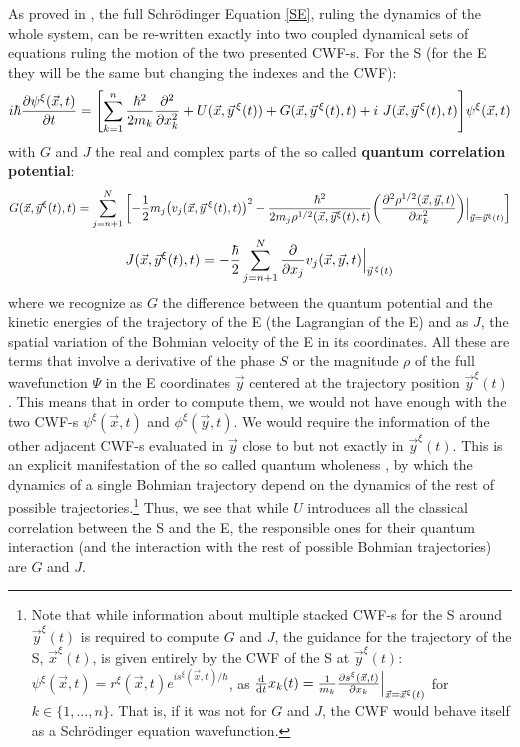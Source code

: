 \documentclass[11pt, a4paper]{article} %
\begin{document}
As proved in \cite{GJ}, the full Schrödinger Equation \eqref{SE}, ruling the dynamics of the whole system, can be re-written exactly into two coupled dynamical sets of equations ruling the motion of the two presented CWF-s. For the S (for the E they will be the same but changing the indexes and the CWF):
\begin{equation}\label{SE.GJ}
i \hbar \pdv{\psi^\xi (\vec{x},t)}{t} = \qty[\sum_{k=1}^n\frac{\hbar^2}{2m_k} \pdv[2]{}{x_k} +  U(\vec{x}, \vec{y}^{\, \xi}(t)) + G(\vec{x}, \vec{y}^{\, \xi}(t),t)+i\ J(\vec{x}, \vec{y}^{\, \xi}(t),t)] \psi^\xi (\vec{x},t)
\end{equation}
with $G$ and $J$ the real and complex parts of the so called {\bf quantum correlation potential}:
\begin{equation}\label{G.Bohm}
G(\vec{x},\vec{y}^\xi(t),t)=\sum_{j=n+1}^N\qty[-\frac{1}{2}m_j\qty(v_j(\vec{x},\vec{y}^{\, \xi}(t),t))^2-\frac{\hbar^2}{2m_j\rho^{1/2}(\vec{x},\vec{y}^\xi(t),t)}\qty(\pdv[2]{\rho^{1/2}(\vec{x},\vec{y},t)}{x_k})\Big\rvert_{\vec{y}=\vec{y}^\xi(t)} ]
\end{equation}
\begin{equation}\label{J.Bohm}
J(\vec{x},\vec{y}^\xi(t),t)=-\frac{\hbar}{2}\sum_{j=n+1}^N\pdv{}{x_j}v_j(\vec{x},\vec{y},t)\Big\rvert_{\vec{y}^{\, \xi}(t)}
\end{equation}
where we recognize as $G$ the difference between the quantum potential \cite{JordiXavier, Durr} and the kinetic energies of the trajectory of the E (the Lagrangian of the E) and as $J$, the spatial variation of the Bohmian velocity of the E in its coordinates. All these are terms that involve a derivative of the phase $S$ or the magnitude $\rho$ of the full wavefunction $\Psi$ in the E coordinates $\vec{y}$ centered at the trajectory position $\vec{y}^\xi(t)$. This means that in order to compute them, we would not have enough with the two CWF-s $\psi^\xi(\vec{x},t)$ and $\phi^\xi(\vec{y},t)$. We would require the information of the other adjacent CWF-s evaluated in $\vec{y}$ close to but not exactly in $\vec{y}^\xi(t)$. This is an explicit manifestation of the so called quantum wholeness \cite{JordiXavier}, by which the dynamics of a single Bohmian trajectory depend on the dynamics of the rest of possible trajectories.\footnote{Note that while information about multiple stacked CWF-s for the S around $\vec{y}^\xi(t)$ is required to compute $G$ and $J$, the guidance for the trajectory of the S, $\vec{x}^\xi(t)$, is given entirely by the CWF of the S at $\vec{y}^\xi(t)$: $\psi^\xi (\vec{x},t)=r^\xi(\vec{x},t)e^{is^\xi(\vec{x},t)/\hbar}$, as $\dv{}{t}x_k(t)=\frac{1}{m_k}\pdv{s^\xi(\vec{x},t)}{x_k}\Big\rvert_{\vec{x}=\vec{x}^\xi(t)}$ for $k\in\{1,...,n\}$. That is, if it was not for $G$ and $J$, the CWF would behave itself as a Schrödinger equation wavefunction.} Thus, we see that while $U$ introduces all the classical correlation between the S and the E, the responsible ones for their quantum interaction (and the interaction with the rest of possible Bohmian trajectories) are $G$ and $J$.
\end{document}
